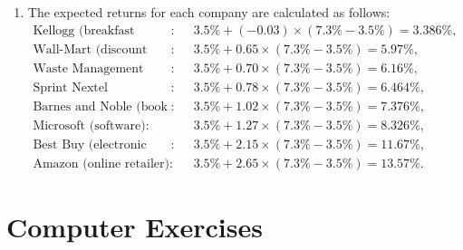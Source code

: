 \documentclass[12pt]{article}
\begin{document}
\begin{enumerate}
{\begin{enumerate}
\item The expected returns for each company are calculated as follows:
$$
\begin{aligned}
\text{Kellogg (breakfast cereal)}: & \quad 3.5\% + (-0.03) \times (7.3\% - 3.5\%) = 3.386\%, \\
\text{Wall-Mart (discount retailer)}: & \quad 3.5\% + 0.65 \times (7.3\% - 3.5\%) = 5.97\%, \\
\text{Waste Management (Waste disposal)}: & \quad 3.5\% + 0.70 \times (7.3\% - 3.5\%) = 6.16\%, \\
\text{Sprint Nextel (telecommunications)}: & \quad 3.5\% + 0.78 \times (7.3\% - 3.5\%) = 6.464\%, \\
\text{Barnes and Noble (book retailer)}: & \quad 3.5\% + 1.02 \times (7.3\% - 3.5\%) = 7.376\%, \\
\text{Microsoft (software)}: & \quad 3.5\% + 1.27 \times (7.3\% - 3.5\%) = 8.326\%, \\
\text{Best Buy (electronic equipment retailer)}: & \quad 3.5\% + 2.15 \times (7.3\% - 3.5\%) = 11.67\%, \\
\text{Amazon (online retailer)}: & \quad 3.5\% + 2.65 \times (7.3\% - 3.5\%) = 13.57\%.
\end{aligned}
$$

    \end{enumerate}

}

\end{enumerate}

\section*{Computer Exercises}
\end{document}
